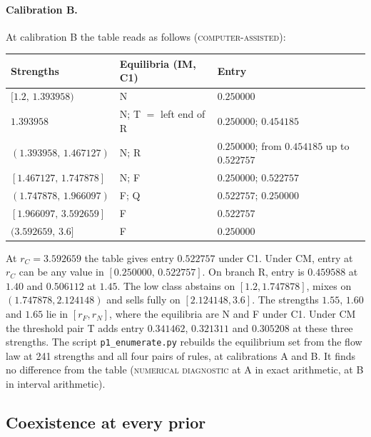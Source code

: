 \documentclass[11pt]{article}
\theoremstyle{definition}
\newcommand{\lab}[1]{\textsc{#1}}
\begin{document}
\paragraph{Calibration B.} At calibration B the table reads as follows (\lab{computer-assisted}):
\begin{center}
\small
\begin{tabular}{@{}lll@{}}
\toprule
Strengths & Equilibria (IM, C1) & Entry\\
\midrule
$[1.2,\,1.393958)$ & N & $0.250000$\\
$1.393958$ & N; T $=$ left end of R & $0.250000$; $0.454185$\\
$(1.393958,\,1.467127)$ & N; R & $0.250000$; from $0.454185$ up to $0.522757$\\
$[1.467127,\,1.747878]$ & N; F & $0.250000$; $0.522757$\\
$(1.747878,\,1.966097)$ & F; Q & $0.522757$; $0.250000$\\
$[1.966097,\,3.592659]$ & F & $0.522757$\\
$(3.592659,\,3.6]$ & F & $0.250000$\\
\bottomrule
\end{tabular}
\end{center}
At $r_C=3.592659$ the table gives entry $0.522757$ under C1. Under CM, entry at $r_C$ can be any value in
$[0.250000,\,0.522757]$.
On branch R, entry is $0.459588$ at $1.40$ and $0.506112$ at $1.45$. The low class abstains on
$[1.2,1.747878]$, mixes on $(1.747878,2.124148)$ and sells fully on $[2.124148,3.6]$. The strengths $1.55$, $1.60$
and $1.65$ lie in $[r_F,r_N]$, where the equilibria are N and F under C1. Under CM the threshold pair T adds
entry $0.341462$, $0.321311$ and $0.305208$ at these three strengths. The script \texttt{p1\_enumerate.py} rebuilds
the equilibrium set from the flow law at 241 strengths and all four pairs of rules, at calibrations A and B.
It finds no difference from the table (\lab{numerical diagnostic} at A in exact arithmetic, at B in interval
arithmetic).

\subsection{Coexistence at every prior}
\end{document}
